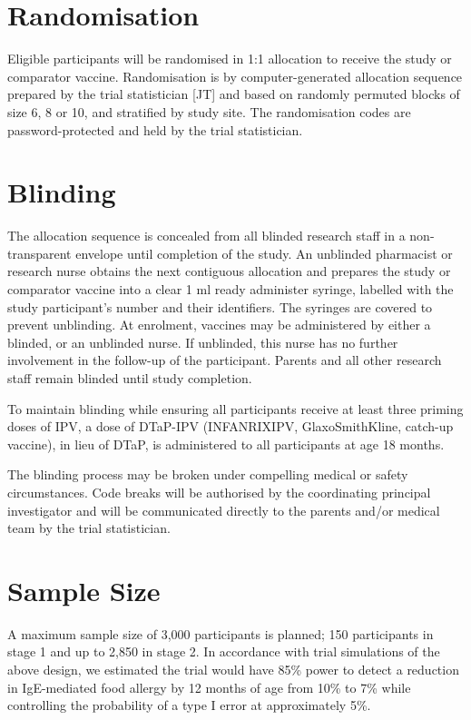 \documentclass{bmcart}
\begin{document}
\section*{Randomisation}

Eligible participants will be randomised in 1:1 allocation to receive the study or comparator vaccine.
Randomisation is by computer-generated allocation sequence prepared by the trial statistician [JT] and based on randomly permuted blocks of size 6, 8 or 10, and stratified by study site.
The randomisation codes are password-protected and held by the trial statistician.

\section*{Blinding}

The allocation sequence is concealed from all blinded research staff in a non-transparent envelope until completion of the study.
An unblinded pharmacist or research nurse obtains the next contiguous allocation and prepares the study or comparator vaccine into a clear 1 ml ready administer syringe, labelled with the study participant's number and their identifiers.
The syringes are covered to prevent unblinding.
At enrolment, vaccines may be administered by either a blinded, or an unblinded nurse.
If unblinded, this nurse has no further involvement in the follow-up of the participant.
Parents and all other research staff remain blinded until study completion.

To maintain blinding while ensuring all participants receive at least three priming doses of IPV, a dose of DTaP-IPV (INFANRIX\textregistered IPV, GlaxoSmithKline, catch-up vaccine), in lieu of DTaP, is administered to all participants at age 18 months.

The blinding process may be broken under compelling medical or safety circumstances. 
Code breaks will be authorised by the coordinating principal investigator and will be communicated directly to the parents and/or medical team by the trial statistician.

\section*{Sample Size}

A maximum sample size of 3,000 participants is planned; 150 participants in stage 1 and up to 2,850 in stage 2.
In accordance with trial simulations of the above design, we estimated the trial would have 85\% power to detect a reduction in IgE-mediated food allergy by 12 months of age from 10\% to 7\% while controlling the probability of a type I error at approximately 5\%.
\end{document}
